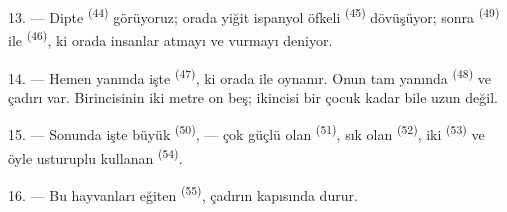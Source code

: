 13. --- Dipte  \textsuperscript{(44)} görüyoruz; orada yiğit
ispanyol  öfkeli 
\textsuperscript{(45)} dövüşüyor; sonra 
\textsuperscript{(49)} ile  \textsuperscript{(46)}, ki orada
insanlar  atmayı ve  vurmayı deniyor.

14. --- Hemen yanında işte  \textsuperscript{(47)},
ki orada  ile  oynanır. Onun tam yanında
 \textsuperscript{(48)} ve  çadırı var.
Birincisinin  iki metre on beş; ikincisi bir çocuk kadar
bile uzun değil.

15. --- Sonunda işte büyük  \textsuperscript{(50)},
 —  çok güçlü olan
 \textsuperscript{(51)},  sık olan
 \textsuperscript{(52)}, iki 
\textsuperscript{(53)} ve  öyle usturuplu kullanan
 \textsuperscript{(54)}.

16. --- Bu hayvanları eğiten  \textsuperscript{(55)}, çadırın
kapısında durur.
\VUsaut{6.0mm}
\VUfilet{22mm}
